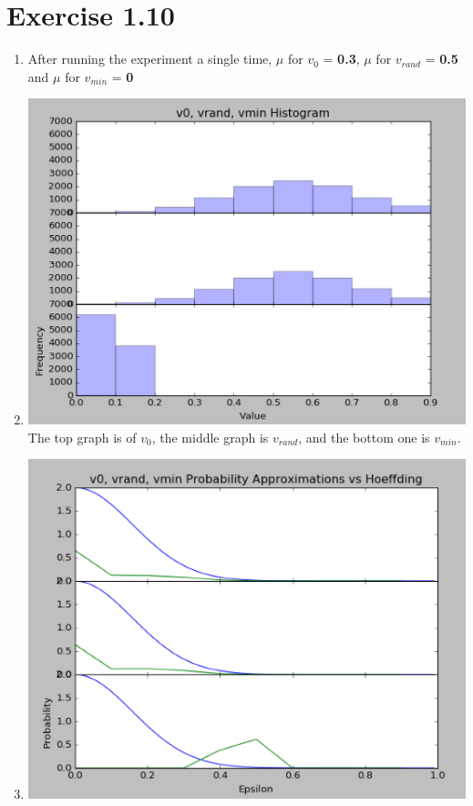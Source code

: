 \documentclass[12pt]{article}
\begin{document}
\section*{Exercise 1.10}
\begin{enumerate}[label=(\alph*)]
	\item After running the experiment a single time, $\mu$ for $v_0$ = \textbf{0.3}, $\mu$ for $v_{rand}$ = \textbf{0.5} and $\mu$ for $v_{min}$ = \textbf{0}
	\item \includegraphics[scale=.5]{1-10-1.png}
	\\ The top graph is of $v_0$, the middle graph is $v_{rand}$, and the bottom one is $v_{min}$.
	\item \includegraphics[scale=.5]{1-10-2.png}

\end{enumerate}
\end{document}
